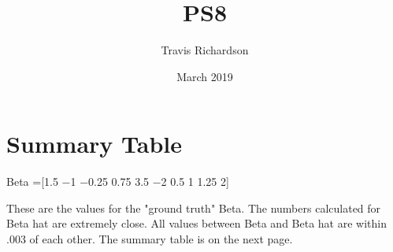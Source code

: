 \documentclass{article}
\title{PS8}
\author{Travis Richardson }
\date{March 2019}
\begin{document}
\maketitle

\section{Summary Table}

Beta =[1.5 −1 −0.25 0.75 3.5 −2 0.5 1 1.25 2]

These are the values for the "ground truth" Beta. The numbers calculated for Beta hat are extremely close. All values between Beta and Beta hat are within .003 of each other. The summary table is on the next page.

\end{document}
